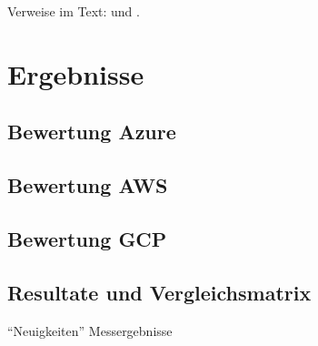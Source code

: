 Verweise im Text: \cite{doc:stz} und \cite{doc:gun}.

\chapter{Ergebnisse}
\label{sec:ergeb}

\section{Bewertung Azure}

\section{Bewertung AWS}

\section{Bewertung GCP}

\section{Resultate und Vergleichsmatrix}

\enquote{Neuigkeiten} Messergebnisse

